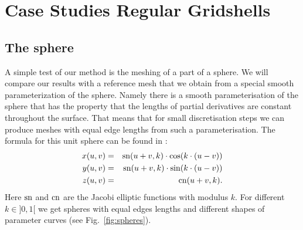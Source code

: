 
\section{Case Studies Regular Gridshells}

\subsection{The sphere}
A simple test of our method is the meshing of a part of a sphere. We will compare our results with a reference mesh that we obtain from a special smooth parameterization of the sphere. Namely there is a smooth parameterisation of the sphere that has the property that the lengths of partial derivatives are constant throughout the surface. That means that for small discretisation steps we can produce meshes with equal edge lengths from such a parameterisation. The formula for this unit sphere can be found in \cite{voss}:
\begin{eqnarray*}
	x(u,v)&=&\operatorname{sn}(u+v, k)\cdot \cos(k\cdot (u-v))\\
	y(u,v)&=&\operatorname{sn}(u+v, k)\cdot \sin(k\cdot (u-v))\\
	z(u,v)&=&\operatorname{cn}(u+v, k).
\end{eqnarray*}
Here $\operatorname{sn}$ and $\operatorname{cn}$ are the Jacobi elliptic functions with modulus $k$. For different $k\in ]0,1[$ we get spheres with equal edges lengths and different shapes of parameter curves (see Fig.~\ref{fig:spheres}).

